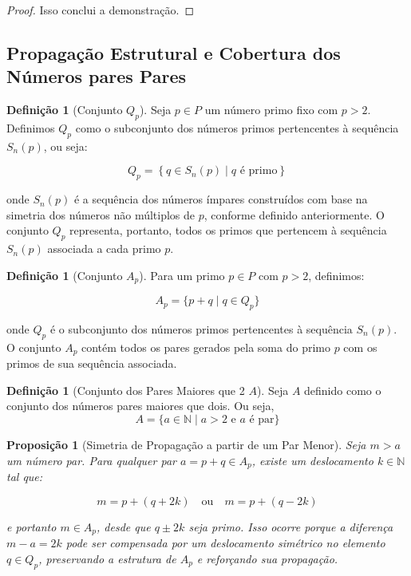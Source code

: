 \documentclass[a4paper,11pt]{article}
\newtheorem{proposition}[theorem]{Proposição}
\theoremstyle{definition}
\newtheorem{definition}[theorem]{Definição}
\theoremstyle{remark}
\begin{document}
\begin{otherlanguage}{brazil}
\begin{proof}
		Isso conclui a demonstração.
	\end{proof}
	
	\subsection{Propagação Estrutural e Cobertura dos Números pares Pares}
	\begin{definition}[Conjunto \(Q_p\)]
		Seja \(p \in P\) um número primo fixo com \(p > 2\). Definimos \(Q_p\) como o subconjunto dos números primos pertencentes à sequência \(S_n(p)\), ou seja:
		
		\[
		Q_p = \left\{ q \in S_n(p) \mid q \text{ é primo} \right\}
		\]
		
		onde \(S_n(p)\) é a sequência dos números ímpares construídos com base na simetria dos números não múltiplos de \(p\), conforme definido anteriormente. O conjunto \(Q_p\) representa, portanto, todos os primos que pertencem à sequência \(S_n(p)\) associada a cada primo \(p\).
	\end{definition}
	
	
	\begin{definition}[Conjunto \(A_p\)]
		Para um primo \(p \in P\) com \(p > 2\), definimos:
		
		\[
		A_p = \{p + q \mid q \in Q_p\}
		\]
		
		onde \(Q_p\) é o subconjunto dos números primos pertencentes à sequência \(S_n(p)\). O conjunto \(A_p\) contém todos os pares gerados pela soma do primo \(p\) com os primos de sua sequência associada.
	\end{definition}
	
	\begin{definition}[Conjunto dos Pares Maiores que 2 \(A\)]
		Seja \(A\) definido como o conjunto dos números pares maiores que dois. Ou seja, 
		\[
		A = \{a \in \mathbb{N} \mid a > 2 \text{ e } a \text{ é par} \}
		\]
	\end{definition}
	
	\begin{proposition}[Simetria de Propagação a partir de um Par Menor]
		Seja \(m > a\) um número par. Para qualquer par \(a = p + q \in A_p\), existe um deslocamento \(k \in \mathbb{N}\) tal que:
		
		\[
		m = p + (q + 2k) \quad \text{ou} \quad m = p + (q - 2k)
		\]
		
		e portanto \(m \in A_p\), desde que \(q \pm 2k\) seja primo. Isso ocorre porque a diferença \(m - a = 2k\) pode ser compensada por um deslocamento simétrico no elemento \(q \in Q_p\), preservando a estrutura de \(A_p\) e reforçando sua propagação.
	\end{proposition}
	

\end{otherlanguage}
\end{document}
